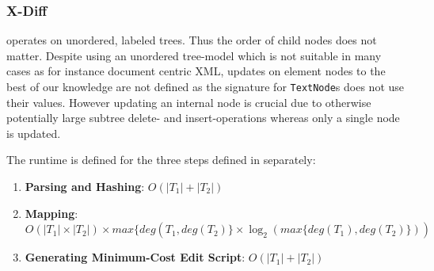 \subsubsection{X-Diff\cite{wang2003x}}
operates on unordered, labeled trees. Thus the order of child nodes does not matter. Despite using an unordered tree-model which is not suitable in many cases as for instance document centric XML, updates on element nodes to the best of our knowledge are not defined as the signature for \texttt{TextNode}s does not use their values. However updating an internal node is crucial due to otherwise potentially large subtree delete- and insert-operations whereas only a single node is updated.






The runtime is defined for the three steps defined in \cite{wang2003x} separately: 

\begin{enumerate}
\item {\bf{Parsing and Hashing}}: $O(|T_{1}| + |T_{2}|)$
\item {\bf{Mapping}}: $O(|T_{1}| \times |T_{2}|) \times max\{deg(T_{1}, deg(T_{2})\} \times \log_{2}(max\{deg(T_{1}), deg(T_{2})\}))$
\item {\bf{Generating Minimum-Cost Edit Script}}: $O(|T_{1}| + |T_{2}|)$
\end{enumerate}

